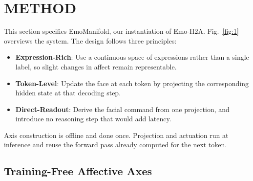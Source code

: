 \documentclass[letterpaper, 10 pt, conference]{ieeeconf/ieeeconf}
\begin{document}
\section{METHOD}
\label{sec:method}

This section specifies EmoManifold, our instantiation of Emo-H2A. Fig.~\ref{fig:1} overviews the system. The design follows three principles:
\begin{itemize}
\item \textbf{Expression-Rich}: Use a continuous space of expressions rather than a single label, so slight changes in affect remain representable.
\item \textbf{Token-Level}: Update the face at each token by projecting the corresponding hidden state at that decoding step.
\item \textbf{Direct-Readout}: Derive the facial command from one projection, and introduce no reasoning step that would add latency.
\end{itemize}
Axis construction is offline and done once. Projection and actuation run at inference and reuse the forward pass already computed for the next token.

\subsection{Training-Free Affective Axes}
\label{sec:axis_mining}
\end{document}
